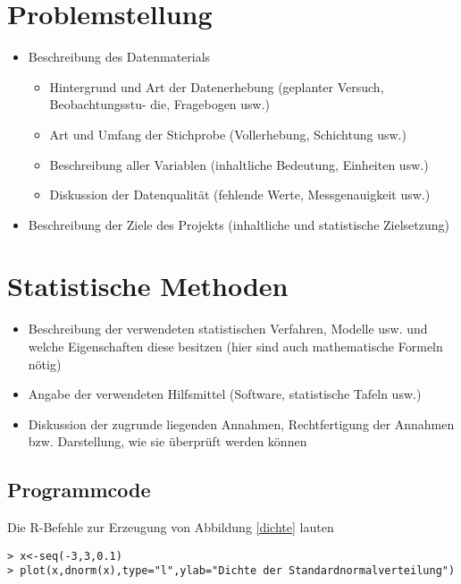 \documentclass[a4paper,12pt]{article}
\begin{document}
\section{Problemstellung}

\begin{itemize}
\item Beschreibung des Datenmaterials
\begin{itemize}
\item Hintergrund und Art der Datenerhebung (geplanter Versuch, Beobachtungsstu- die, Fragebogen usw.)
\item Art und Umfang der Stichprobe (Vollerhebung, Schichtung usw.)
\item Beschreibung aller Variablen (inhaltliche Bedeutung, Einheiten usw.)
\item Diskussion der Datenqualität (fehlende Werte, Messgenauigkeit usw.)
\end{itemize}
\item Beschreibung der Ziele des Projekts (inhaltliche und statistische Zielsetzung)
\end{itemize}


\section{Statistische Methoden}
\begin{itemize}
\item Beschreibung der verwendeten statistischen Verfahren, Modelle usw. und welche
Eigenschaften diese besitzen (hier sind auch mathematische Formeln nötig)
\item Angabe der verwendeten Hilfsmittel (Software, statistische Tafeln usw.)
\item Diskussion der zugrunde liegenden Annahmen, Rechtfertigung der Annahmen bzw.
Darstellung, wie sie überprüft werden können
\end{itemize}


\subsection{Programmcode}
Die R-Befehle zur Erzeugung von Abbildung \ref{dichte} lauten

\begin{verbatim}
> x<-seq(-3,3,0.1)
> plot(x,dnorm(x),type="l",ylab="Dichte der Standardnormalverteilung")
\end{verbatim}

\newpage %
%
\end{document}
